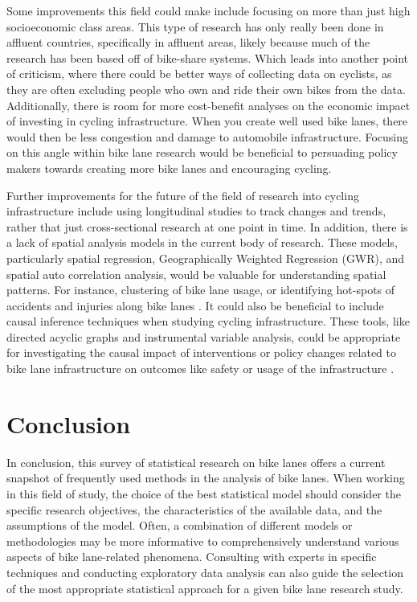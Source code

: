 \documentclass[12pt, letterpaper]{article}
\begin{document}
Some improvements this field could make include focusing on more than just high socioeconomic class areas. This type of research has only really been done in affluent countries, specifically in affluent areas, likely because much of the research has been based off of bike-share systems. Which leads into another point of criticism, where there could be better ways of collecting data on cyclists, as they are often excluding people who own and ride their own bikes from the data. Additionally, there is room for more cost-benefit analyses on the economic impact of investing in cycling infrastructure. When you create well used bike lanes, there would then be less congestion and damage to automobile infrastructure. Focusing on this angle within bike lane research would be beneficial to persuading policy makers towards creating more bike lanes and encouraging cycling. 

Further improvements for the future of the field of research into cycling infrastructure include using longitudinal studies to track changes and trends, rather that just cross-sectional research at one point in time. In addition, there is a lack of spatial analysis models in the current body of research. These models, particularly spatial regression, Geographically Weighted Regression (GWR), and spatial auto correlation analysis, would be valuable for understanding spatial patterns. For instance, clustering of bike lane usage, or identifying hot-spots of accidents and injuries along bike lanes \cite{Kanade_2022}. It could also be beneficial to include causal inference techniques when studying cycling infrastructure. These tools, like directed acyclic graphs and instrumental variable analysis, could be appropriate for investigating the causal impact of interventions or policy changes related to bike lane infrastructure on outcomes like safety or usage of the infrastructure \cite{Pearce_Lawlor_2016}. 

\section{Conclusion}
\label{sec:conc}

In conclusion, this survey of statistical research on bike lanes offers a current snapshot of frequently used methods in the analysis of bike lanes. When working in this field of study, the choice of the best statistical model should consider the specific research objectives, the characteristics of the available data, and the assumptions of the model. Often, a combination of different models or methodologies may be more informative to comprehensively understand various aspects of bike lane-related phenomena. Consulting with experts in specific techniques and conducting exploratory data analysis can also guide the selection of the most appropriate statistical approach for a given bike lane research study. \par
\end{document}

